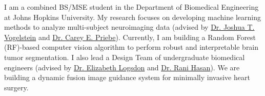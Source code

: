 \documentclass[11pt, letterpaper, sans, citecolor=blue, colorlinks=true, urlcolor=blue]{moderncv}
\begin{document}
\makecvtitle
\vspace*{-1.5\baselineskip}
I am a combined BS/MSE student in the Department of Biomedical Engineering at Johns Hopkins University. My research focuses on developing machine learning methods to analyze multi-subject neuroimaging data (advised by \href{https://jovo.me}{Dr. Joshua T. Vogelstein} and \href{https://www.ams.jhu.edu/~priebe/}{Dr. Carey E. Priebe}). Currently, I am building a Random Forest (RF)-based computer vision algorithm to perform robust and interpretable brain tumor segmentation. I also lead a Design Team of undergraduate biomedical engineers (advised by \href{https://www.bme.jhu.edu/people/faculty/elizabeth-logsdon/}{Dr. Elizabeth Logsdon} and \href{https://www.hopkinsmedicine.org/profiles/results/directory/profile/1571333/rani-hasan}{Dr. Rani Hasan}). 
We are building a dynamic fusion image guidance system for minimally invasive heart surgery.


% 




% 

\end{document}
